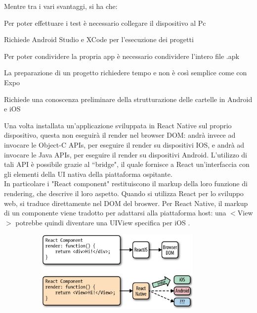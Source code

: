 Mentre tra i vari svantaggi, si ha che:
\begin{list}{*}{}
      \item Per poter effettuare i test \`e necessario collegare il dispositivo al Pc
      \item Richiede Android Studio e XCode per l'esecuzione dei progetti
      \item Per poter condividere la propria app \`e necessario condividere l'intero file .apk
      \item La preparazione di un progetto richiedere tempo e non \`e cos\`i  semplice come con Expo
      \item Richiede una conoscenza preliminare della strutturazione delle cartelle in Android e iOS
\end{list}

Una volta installata un'applicazione sviluppata in React Native sul proprio dispositivo, questa non eseguir\`a il render nel browser DOM: andr\`a invece ad invocare le Object-C APIs, per eseguire il render su dispositivi IOS,
e andr\`a ad invocare le Java APIs, per eseguire il render su dispositivi Android. L'utilizzo di tali API \`e possibile grazie al ``bridge", il quale fornisce a React un'interfaccia con gli elementi
della UI nativa della piattaforma ospitante.\\ In particolare i "React component" restituiscono il markup della loro funzione di rendering,
che descrive il loro aspetto. Quando si utilizza React per lo sviluppo web, si traduce direttamente nel DOM del broswer. Per React Native, il markup di un componente viene tradotto per adattarsi alla piattaforma host:
una $<$View$>$ potrebbe quindi diventare una UIView specifica per iOS \cite{ReactNative} \cite{ReactNativeCLI:Expo}.

\begin{figure}[h]
      \centering
      \includegraphics[width=10cm, height=4cm]{images/ReactRendering.jpg}
      \caption[differenzeiteot]{}
      \label{fig:ReactRendering}
\end{figure}


